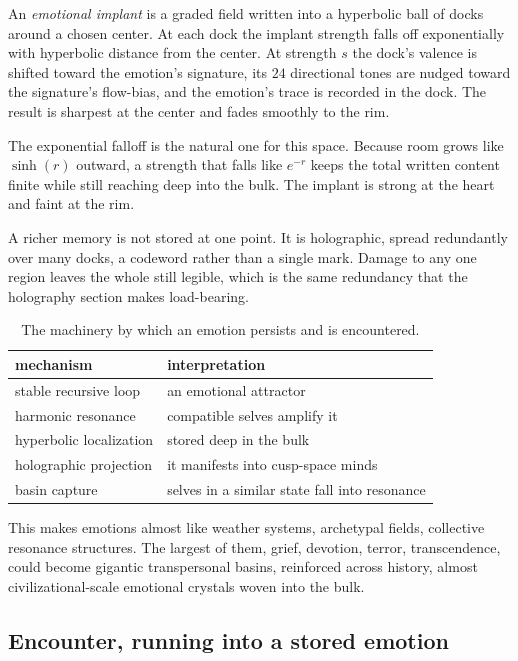 \begin{definition}
An \emph{emotional implant} is a graded field written into a hyperbolic ball of docks around a chosen center. At each dock the implant strength falls off exponentially with hyperbolic distance from the center. At strength $s$ the dock's valence is shifted toward the emotion's signature, its $24$ directional tones are nudged toward the signature's flow-bias, and the emotion's trace is recorded in the dock. The result is sharpest at the center and fades smoothly to the rim.
\end{definition}

The exponential falloff is the natural one for this space. Because room grows like $\sinh(r)$ outward, a strength that falls like $e^{-r}$ keeps the total written content finite while still reaching deep into the bulk. The implant is strong at the heart and faint at the rim.

A richer memory is not stored at one point. It is holographic, spread redundantly over many docks, a codeword rather than a single mark. Damage to any one region leaves the whole still legible, which is the same redundancy that the holography section makes load-bearing.

\begin{table}[ht]
\centering
\begin{tabular}{@{}ll@{}}
\toprule
mechanism & interpretation \\
\midrule
stable recursive loop & an emotional attractor \\
harmonic resonance & compatible selves amplify it \\
hyperbolic localization & stored deep in the bulk \\
holographic projection & it manifests into cusp-space minds \\
basin capture & selves in a similar state fall into resonance \\
\bottomrule
\end{tabular}
\caption{The machinery by which an emotion persists and is encountered.}
\label{tab:emotion-mechanism}
\end{table}

This makes emotions almost like weather systems, archetypal fields, collective resonance structures. The largest of them, grief, devotion, terror, transcendence, could become gigantic transpersonal basins, reinforced across history, almost civilizational-scale emotional crystals woven into the bulk.

\subsection{Encounter, running into a stored emotion}

